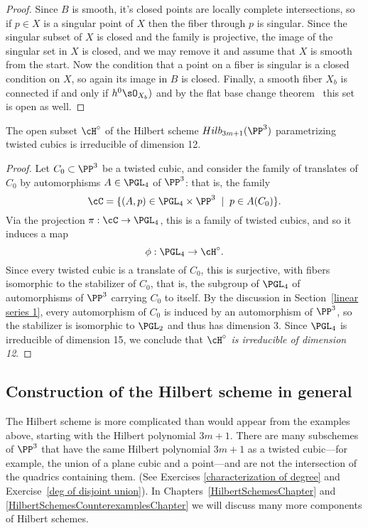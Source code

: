 \begin{proof}
Since $B$ is smooth, it's closed points are locally complete intersections, so if $p\in X$ is a singular point of $X$ then the fiber through $p$ is singular. Since the singular subset of $X$ is closed and the family is projective, the image of the singular set in $X$ is closed, and we may remove it and assume that $X$ is smooth from the start. Now the condition that a point on a fiber is singular is a closed condition on $X$, so again its image in $B$ is closed. Finally, a smooth fiber $X_b$ is connected if and only if $h^0\sO_{X_b})$ and by the flat base change theorem~\cite[Theorem 12.11]{Hartshorne1977} this set is open as well.
\end{proof}


\begin{proposition}\label{hilb of twisted cubics}
The open subset $\cH^\circ$ of the Hilbert scheme $Hilb_{3m+1}(\PP^3)$ parametrizing twisted cubics is irreducible of dimension 12.
\end{proposition}

\begin{proof}  Let $C_0 \subset \PP^3$ be a twisted cubic, and consider the family of translates of $C_0$ by automorphisms $A \in \PGL_4$ of $\PP^3$: that is, the family
$$
\cC = \{ (A, p) \in \PGL_4 \times \PP^3 \; \mid \; p \in A(C_0) \}.
$$
Via the projection $\pi : \cC \to \PGL_4$, this is a family of twisted cubics, and so it induces a map
$$
\phi : \PGL_4 \to \cH^\circ.
$$
Since every twisted cubic is a translate of $C_0$, this is surjective, with fibers isomorphic to the stabilizer of $C_0$, that is, the subgroup of $\PGL_4$ of automorphisms of $\PP^3$ carrying $C_0$ to itself. By the discussion in Section~\ref{linear series 1}, every automorphism of $C_{0}$ is induced by an automorphism of $\PP^{3}$, so the stabilizer is isomorphic to $\PGL_2$ and  thus has dimension 3. Since $\PGL_4$ is irreducible of dimension 15, we conclude that \emph{$\cH^\circ$ is irreducible of dimension 12}.
\end{proof}


\subsection{Construction of the Hilbert scheme in general}\label{hilb construction}

The Hilbert scheme is more complicated than would appear from the examples above, starting with the Hilbert polynomial $3m+1$. There are many subschemes of $\PP^3$ that have the same Hilbert polynomial $3m+1$ as a twisted cubic---for example, the union of a plane cubic and a point---and are not the intersection of the quadrics containing them. (See Exercises \ref{characterization of degree} and Exercise~\ref{deg of disjoint union}). In Chapters~\ref{HilbertSchemesChapter}
and \ref{HilbertSchemesCounterexamplesChapter} we will discuss many more components of Hilbert schemes.

